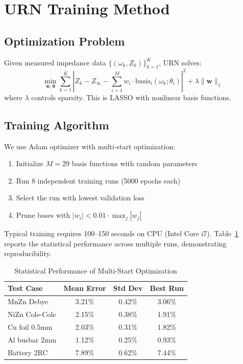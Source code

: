 \documentclass{ieeeaccess}
\begin{document}
\section{URN Training Method}
\label{sec:method}

\subsection{Optimization Problem}

Given measured impedance data $\{(\omega_k, Z_k)\}_{k=1}^{K}$, URN solves:
\begin{equation}
\min_{\mathbf{w}, \boldsymbol{\theta}} \sum_{k=1}^{K} \left| Z_k - Z_\infty - \sum_{i=1}^{M} w_i \cdot \text{basis}_i(\omega_k; \theta_i) \right|^2 + \lambda \|\mathbf{w}\|_1
\label{eq:optimization}
\end{equation}
where $\lambda$ controls sparsity. This is LASSO \cite{tibshirani1996regression} with nonlinear basis functions.

\subsection{Training Algorithm}

We use Adam optimizer \cite{kingma2014adam} with multi-start optimization:
\begin{enumerate}
\item Initialize $M = 29$ basis functions with random parameters
\item Run 8 independent training runs (5000 epochs each)
\item Select the run with lowest validation loss
\item Prune bases with $|w_i| < 0.01 \cdot \max_j |w_j|$
\end{enumerate}

Typical training requires 100--150 seconds on CPU (Intel Core i7). Table~\ref{tab:statistics} reports the statistical performance across multiple runs, demonstrating reproducibility.

\begin{table}[!t]
\caption{Statistical Performance of Multi-Start Optimization}
\label{tab:statistics}
\centering
\begin{tabular}{@{}lccc@{}}
\toprule
\textbf{Test Case} & \textbf{Mean Error} & \textbf{Std Dev} & \textbf{Best Run} \\
\midrule
MnZn Debye & 3.21\% & 0.42\% & 3.06\% \\
NiZn Cole-Cole & 2.15\% & 0.38\% & 1.91\% \\
Cu foil 0.5mm & 2.03\% & 0.31\% & 1.82\% \\
Al busbar 2mm & 1.12\% & 0.25\% & 0.93\% \\
Battery 2RC & 7.89\% & 0.62\% & 7.44\% \\
\bottomrule
\end{tabular}
\end{table}
\end{document}
